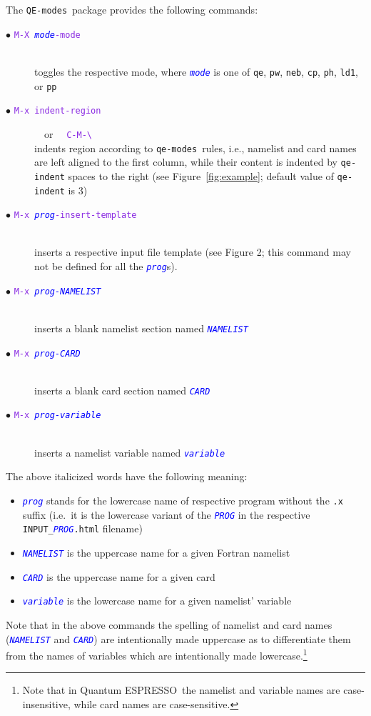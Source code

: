 \documentclass[12pt,a4paper]{article}
\def\qe{{\sc Quantum ESPRESSO}}
\def\QEmodes{\texttt{QE-modes}}
\def\qemodes{\texttt{qe-modes}}
\def\efn#1{\textcolor{BlueViolet}{\texttt{#1}}}
\def\var#1{\textcolor{Blue}{\texttt{\textit{#1}}}}
\begin{document}
The \QEmodes\ package provides the following commands:
\begin{description}
\item[$\bullet$ \efn{M-X \var{mode}-mode}]\hfill\\ toggles
  the respective mode, where \var{mode} is one of \texttt{qe},
  \texttt{pw}, \texttt{neb}, \texttt{cp}, \texttt{ph}, \texttt{ld1}, or \texttt{pp}

\item[$\bullet$ \efn{M-x indent-region}] ~~{\rm or}~~ \efn{C-M-\textbackslash}\hfill\\
  indents region according to \qemodes\ rules, i.e., namelist and card
  names are left aligned to the first column, while their content is
  indented by \texttt{qe-indent} spaces to the right (see
  Figure~\ref{fig:example}; default value of \texttt{qe-indent} is 3)

\item[$\bullet$ \efn{M-x \var{prog}-insert-template}]\hfill\\
  inserts a respective input file template (see Figure 2; this
  command may not be defined for all the \var{prog}s).

\item[$\bullet$ \efn{M-x \var{prog-NAMELIST}}]\hfill\\ 
  inserts a blank namelist section named \var{NAMELIST}

\item[$\bullet$ \efn{M-x \var{prog-CARD}}]\hfill\\
  inserts a blank card section named \var{CARD}

\item[$\bullet$ \efn{M-x \var{prog-variable}}]\hfill\\
  inserts a namelist variable named \var{variable}

\end{description}
The above italicized words have the following meaning:
\begin{itemize}
\item \var{prog} stands for the lowercase name of respective program
  without the \texttt{.x} suffix (i.e.\ it is the lowercase variant of
  the \var{PROG} in the respective \texttt{INPUT\_\var{PROG}.html}
  filename)
\item \var{NAMELIST} is the uppercase name for a given Fortran namelist
\item \var{CARD} is the uppercase name for a given card
\item \var{variable} is the lowercase name for a given namelist' variable
\end{itemize}
Note that in the above commands the spelling of namelist and card
names (\var{NAMELIST} and \var{CARD}) are intentionally made uppercase
as to differentiate them from the names of variables which are
intentionally made lowercase.\footnote{Note that in \qe\ the namelist
  and variable names are case-insensitive, while card names are
  case-sensitive.}
\end{document}
